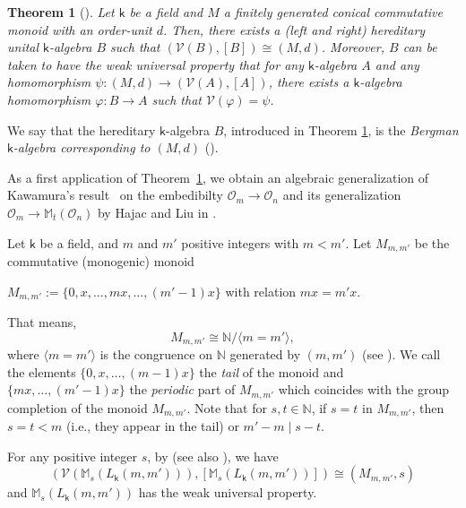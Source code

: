 \documentclass[a4paper, 11pt, reqno]{amsart}
\newtheorem{thm}{Theorem}[section]
\theoremstyle{definition}
\let\phi\varphi
\def\M{\mathbb{M}}
\newcommand{\K}{\mathsf{k}}
\begin{document}
\begin{thm}[{\cite[Theorem 6.2]{Berg74}}]\label{Bergman}
Let $\K$ be a field and $M$	a finitely generated conical commutative monoid with an order-unit $d$. Then, there exists a (left and right) hereditary unital $\K$-algebra $B$ such that $(\mathcal{V}(B), [B])\cong (M, d)$. Moreover, $B$ can be taken to have the weak universal property that for any $\K$-algebra $A$ and any homomorphism $\psi: (M, d)\longrightarrow (\mathcal{V}(A), [A])$, there exists a $\K$-algebra homomorphism $\phi: B \longrightarrow A$ such that $\mathcal{V}(\phi) = \psi$.
\end{thm}

We say that the hereditary $\K$-algebra  $B$, introduced in Theorem \ref{Bergman}, is the {\it Bergman $\K$-algebra corresponding to $(M, d)$} (\cite{Genenotices,lpabook}).

As a first application of Theorem~\ref{Bergman}, we obtain an algebraic generalization of Kawamura's result~\cite[Lemma 2.1]{Kawa} on the embedibilty $\mathcal O_m \rightarrow \mathcal O_n$ and its generalization $\mathcal O_m \rightarrow \M_t(\mathcal O_n)$ by Hajac and Liu in \cite[Theorem 4.5]{HajLiu}. 



Let $\K$ be a field, and $m$ and $m'$ positive integers with $m < m'$. Let $M_{m, m'}$ be the commutative (monogenic) monoid
\begin{center}
$M_{m, m'} := \{0, x, \hdots, mx, \hdots, (m'-1)x\}$ with relation $mx = m'x$.
\end{center}
That means, $$M_{m, m'}\cong \mathbb{N}/\langle m =m'\rangle,$$ 
where $\langle m =m'\rangle$ is the congruence on $\mathbb{N}$ generated by $(m, m')$ (see \cite[Chapter~1]{howie}). 
We call the elements $\{0,x,\hdots, (m-1)x\}$ the \emph{tail} of the monoid and $\{mx, \hdots, (m'-1)x\}$ the \emph{periodic} part of $M_{m, m'}$ which coincides with the group completion of
the monoid $M_{m,m'}$. Note that for $s,t \in \mathbb N$, if $s=t$ in $M_{m,m'}$, then $s=t<m$ (i.e., they appear in the tail) or $m'-m\mid s-t$.


For any positive integer $s$, by \cite[Theorems 6.1 and 7.3]{Berg74} (see also \cite[Theorem~5.7]{GeneRooz}), we have 
\begin{equation}\label{monformula}
    \left (\mathcal{V}(\M_s(L_{\K}(m, m'))), [\M_s(L_{\K}(m, m'))]\right )\cong (M_{m, m'}, s)
\end{equation}
 and $\M_s(L_{\K}(m, m'))$ has the weak universal property. 
 
\end{document}
